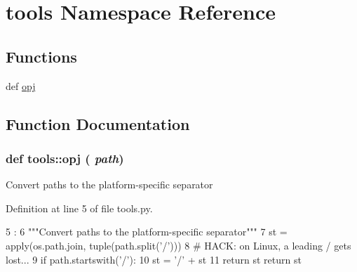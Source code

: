 \hypertarget{namespacetools}{
\section{tools Namespace Reference}
\label{namespacetools}
}
\subsection*{Functions}
\begin{DoxyCompactItemize}
\item 
def \hyperlink{namespacetools_a927391568c65e48580526412fb7d49ab}{opj}
\end{DoxyCompactItemize}


\subsection{Function Documentation}
\hypertarget{namespacetools_a927391568c65e48580526412fb7d49ab}{
\subsubsection[{opj}]{\setlength{\rightskip}{0pt plus 5cm}def tools::opj ( {\em path})}}
\label{namespacetools_a927391568c65e48580526412fb7d49ab}
\begin{DoxyVerb}Convert paths to the platform-specific separator\end{DoxyVerb}
 

Definition at line 5 of file tools.py.


\begin{DoxyCode}
5              :
6     """Convert paths to the platform-specific separator"""
7     st = apply(os.path.join, tuple(path.split('/')))
8     # HACK: on Linux, a leading / gets lost...
9     if path.startswith('/'):
10         st = '/' + st
11     return st
    return st
\end{DoxyCode}
